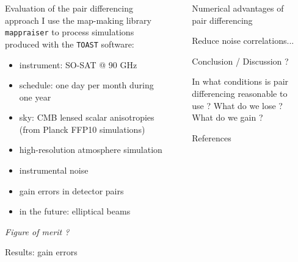 \documentclass[final]{beamer}
\newlength{\sepwidth}
\newlength{\colwidth}
\newcommand{\separatorcolumn}{\begin{column}{\sepwidth}\end{column}}
\begin{document}
\begin{frame}[t]
\begin{columns}[t]
\begin{column}{\colwidth}
\begin{block}{Evaluation of the pair differencing approach}
        I use the map-making library \texttt{mappraiser}\cite{ElBouhargani:2021umq} to process simulations produced with the \texttt{TOAST} software:
        \begin{itemize}
          \item instrument: SO-SAT @ 90 GHz
          \item schedule: one day per month during one year
          \item sky: CMB lensed scalar anisotropies (from Planck FFP10 simulations)
          \item high-resolution atmosphere simulation
          \item instrumental noise
          \item gain errors in detector pairs
          \item in the future: elliptical beams
        \end{itemize}

        \emph{Figure of merit ?}

      \end{block}

      \begin{block}{Results: gain errors}

      \end{block}

    \end{column}

    \separatorcolumn

    \begin{column}{\colwidth}

      \begin{exampleblock}{Numerical advantages of pair differencing}

        Reduce noise correlations...

      \end{exampleblock}

      \begin{block}{Conclusion / Discussion ?}

        In what conditions is pair differencing reasonable to use ?
        What do we lose ? What do we gain ?

      \end{block}

      \begin{block}{References}

        \nocite{*}
        \footnotesize{}

      \end{block}

    \end{column}

    \separatorcolumn
  \end{columns}
\end{frame}
\end{document}
